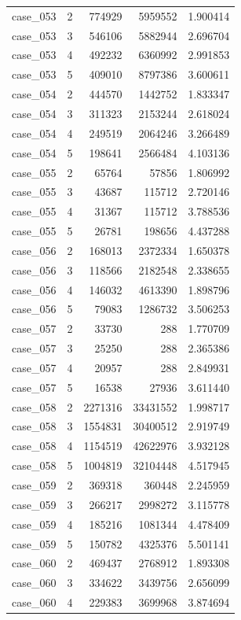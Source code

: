 \begin{longtable}{lrrrr}
case\_053 & 2 & 774929 & 5959552 & 1.900414 \\
case\_053 & 3 & 546106 & 5882944 & 2.696704 \\
case\_053 & 4 & 492232 & 6360992 & 2.991853 \\
case\_053 & 5 & 409010 & 8797386 & 3.600611 \\
case\_054 & 2 & 444570 & 1442752 & 1.833347 \\
case\_054 & 3 & 311323 & 2153244 & 2.618024 \\
case\_054 & 4 & 249519 & 2064246 & 3.266489 \\
case\_054 & 5 & 198641 & 2566484 & 4.103136 \\
case\_055 & 2 & 65764 & 57856 & 1.806992 \\
case\_055 & 3 & 43687 & 115712 & 2.720146 \\
case\_055 & 4 & 31367 & 115712 & 3.788536 \\
case\_055 & 5 & 26781 & 198656 & 4.437288 \\
case\_056 & 2 & 168013 & 2372334 & 1.650378 \\
case\_056 & 3 & 118566 & 2182548 & 2.338655 \\
case\_056 & 4 & 146032 & 4613390 & 1.898796 \\
case\_056 & 5 & 79083 & 1286732 & 3.506253 \\
case\_057 & 2 & 33730 & 288 & 1.770709 \\
case\_057 & 3 & 25250 & 288 & 2.365386 \\
case\_057 & 4 & 20957 & 288 & 2.849931 \\
case\_057 & 5 & 16538 & 27936 & 3.611440 \\
case\_058 & 2 & 2271316 & 33431552 & 1.998717 \\
case\_058 & 3 & 1554831 & 30400512 & 2.919749 \\
case\_058 & 4 & 1154519 & 42622976 & 3.932128 \\
case\_058 & 5 & 1004819 & 32104448 & 4.517945 \\
case\_059 & 2 & 369318 & 360448 & 2.245959 \\
case\_059 & 3 & 266217 & 2998272 & 3.115778 \\
case\_059 & 4 & 185216 & 1081344 & 4.478409 \\
case\_059 & 5 & 150782 & 4325376 & 5.501141 \\
case\_060 & 2 & 469437 & 2768912 & 1.893308 \\
case\_060 & 3 & 334622 & 3439756 & 2.656099 \\
case\_060 & 4 & 229383 & 3699968 & 3.874694 \\

\end{longtable}
